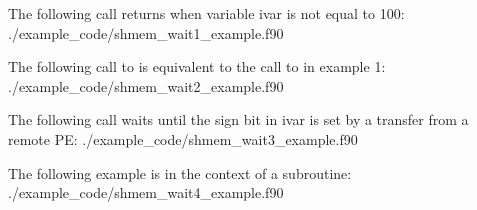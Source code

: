 \begin{apidefinition}
{}



\begin{apiexamples}

\apifexample
{ The following call returns when variable ivar is not equal to 100:}
{./example_code/shmem_wait1_example.f90}
{}

\apifexample
{ The following call to  is  equivalent to the
call to  in example 1:}
{./example_code/shmem_wait2_example.f90}
{}

\apicexample
{The following \CorCpp{} call waits until the sign bit in ivar is set by a
transfer from a remote PE:}
{./example_code/shmem_wait3_example.f90}
{}

\apifexample
{The following \Fortran{} example is in the context of a subroutine:}
{./example_code/shmem_wait4_example.f90}
{}

\end{apiexamples}

\end{apidefinition}

